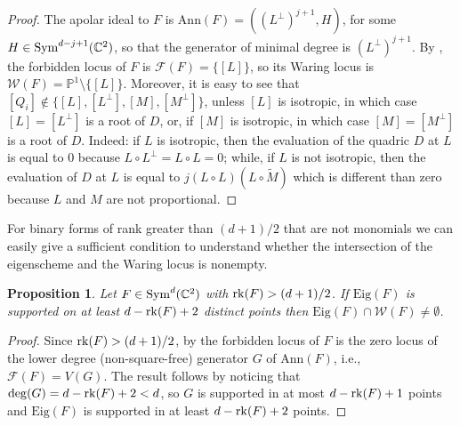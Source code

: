 \documentclass{amsart}
\numberwithin{theorem}{section}
\newtheorem{proposition}[theorem]{Proposition}
\theoremstyle{definition}
\newcommand{\Eig}{\mathrm{Eig}}
\newcommand{\W}{\mathcal{W}}
\newcommand{\PP}{\mathbb{P}}
\newcommand{\CC}{\mathbb{C}}
\newcommand{\rk}{\mathop{\rm rk}\nolimits}
\newcommand{\sym}{\mathop{\rm Sym}\nolimits}
\begin{document}
\begin{proof}
 The apolar ideal to $F$ is $\mathrm{Ann}(F)=((L^\perp)^{j+1},H)$, for some $H\in\sym^{d-j+1}(\CC^2)$, so that the generator of minimal degree is $(L^\perp)^{j+1}$. By \cite[Theorem 3.5]{carlini2017waring}, the forbidden locus of $F$ is $\mathcal{F}(F)=\{ [L]\}$, so its Waring locus is $\W(F)=\PP^1\setminus\{ [L]\}$. Moreover, it is easy to see that $[Q_i]\not\in\{[L],[L^\perp],[M],[M^\perp]\}$, unless $[L]$ is isotropic, in which case $[L]=[L^\perp]$ is a root of $D$, or, if $[M]$ is isotropic, in which case $[M]=[M^\perp]$ is a root of $D$. Indeed: if $L$ is isotropic, then the evaluation of the quadric $D$ at $L$ is equal to $0$ because $L \circ L^\perp = L \circ L = 0$; while, if $L$ is not isotropic, then the evaluation of $D$ at $L$ is equal to $j (L\circ L) (L \circ \widetilde{M})$ which is different than zero because $L$ and $M$ are not proportional.
\end{proof}

For binary forms of rank greater than $(d+1)/2$ that are not monomials we can easily give a sufficient condition to understand whether the intersection of the eigenscheme and the Waring locus is nonempty.
\begin{proposition}
    Let $F\in \sym^d(\CC^2)$ with $\rk(F)>(d+1)/2$. If $\Eig(F)$ is supported on at least $d-\rk(F)+2$ distinct points then $\Eig(F)\cap \W(F)\neq \emptyset$.  
\end{proposition}
\begin{proof}
    Since $\rk(F)>(d+1)/2$, by \cite[Theorem 3.5, item (2)]{carlini2017waring} the forbidden locus of $F$ is the zero locus of the lower degree (non-square-free) generator $G$ of $\mathrm{Ann}(F)$, i.e., $\mathcal{F}(F)=V(G)$. The result follows by noticing that  $\deg(G)=d-\rk(F)+2<d$, so $G$ is supported in at most $d-\rk(F)+1$ points and $\Eig(F)$ is supported in at least $d-\rk(F)+2$ points.
\end{proof}
\end{document}
